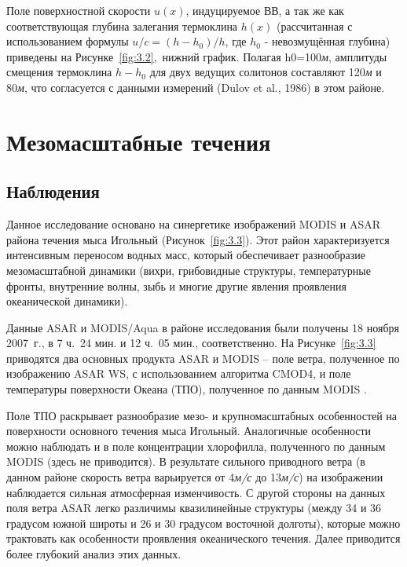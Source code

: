 Поле поверхностной скорости $u(x)$, индуцируемое ВВ, а так же как соответствующая глубина залегания термоклина $h(x)$ (рассчитанная с использованием формулы $u/c=(h-h_{0} )/h$, где $h_{0} $ - невозмущённая глубина) приведены на Рисунке~\ref{fig:3.2},~нижний график. Полагая h0=100\textit{м}, амплитуды смещения термоклина $h-h_{0} $ для двух ведущих солитонов составляют 120\textit{м} и 80\textit{м}, что согласуется с данными измерений (Dulov et al., 1986) в этом районе.



\section{Мезомасштабные течения} \label{sec:3.2}



\subsection{Наблюдения} \label{sec:3.2.1}


Данное исследование основано на синергетике изображений MODIS и ASAR района течения мыса Игольный (Рисунок~\ref{fig:3.3}). Этот район характеризуется интенсивным переносом водных масс, который обеспечивает разнообразие мезомасштабной динамики (вихри, грибовидные структуры, температурные фронты, внутренние волны, зыбь и многие другие явления проявления океанической динамики).

Данные ASAR и MODIS/Aqua в районе исследования были получены 18 ноября 2007~г., в 7 ч.~24 мин. и 12 ч.~05 мин., соответственно. На Рисунке~\ref{fig:3.3} приводятся два основных продукта ASAR и MODIS -- поле ветра, полученное по изображению ASAR WS, с использованием алгоритма CMOD4, и поле температуры поверхности Океана (ТПО), полученное по данным MODIS \citep{Brown1999}.

Поле ТПО раскрывает разнообразие мезо- и крупномасштабных особенностей на поверхности основного течения мыса Игольный. Аналогичные особенности можно наблюдать и в поле концентрации хлорофилла, полученного по данным MODIS (здесь не приводится). В результате сильного приводного ветра (в данном районе скорость ветра варьируется от 4\textit{м/с} до 13\textit{м/с}) на изображении наблюдается сильная атмосферная изменчивость. С другой стороны на данных поля ветра ASAR легко различимы квазилинейные структуры (между 34 и 36 градусом южной широты и 26 и 30 градусом восточной долготы), которые можно трактовать как особенности проявления океанического течения. Далее приводится более глубокий анализ этих данных.

